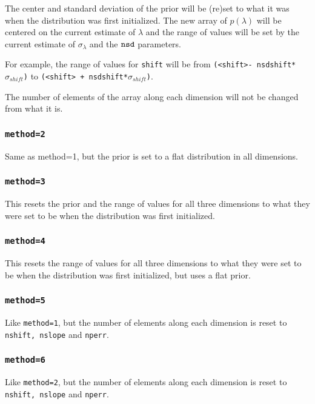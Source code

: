 \documentclass[10pt,letterpaper]{article}
\begin{document}
The center and standard deviation of the prior will be (re)set to what it was 
when the distribution was first initialized. The new array of $p(\lambda)$ will 
be centered on the current estimate of $\lambda$ and the range of values will be 
set by the current estimate of $\sigma_\lambda$ and the ${\tt nsd}$ parameters.

For example, the range of values for {\tt shift} will be from {\tt (<shift>-
nsdshift*$\sigma_{shift}$)} to {\tt (<shift> + nsdshift*$\sigma_{shift}$)}.

The number of elements of the array along each dimension will not be changed 
from what it is.

\subsubsection{\tt method=2}

Same as method=1, but the prior is set to a flat distribution in all dimensions.

\subsubsection{\tt method=3}

This resets the prior and the range of values for all three dimensions to what they
were set to be when the distribution was first initialized.

\subsubsection{\tt method=4}

This resets the range of values for all three dimensions to what they were set 
to be when the distribution was first initialized, but uses a flat prior.

\subsubsection{\tt method=5}

Like {\tt method=1}, but the number of elements along each dimension is reset to 
{\tt nshift, nslope} and {\tt nperr}.

\subsubsection{\tt method=6}

Like {\tt method=2}, but the number of elements along each dimension is reset to 
{\tt nshift, nslope} and {\tt nperr}.
\end{document}
